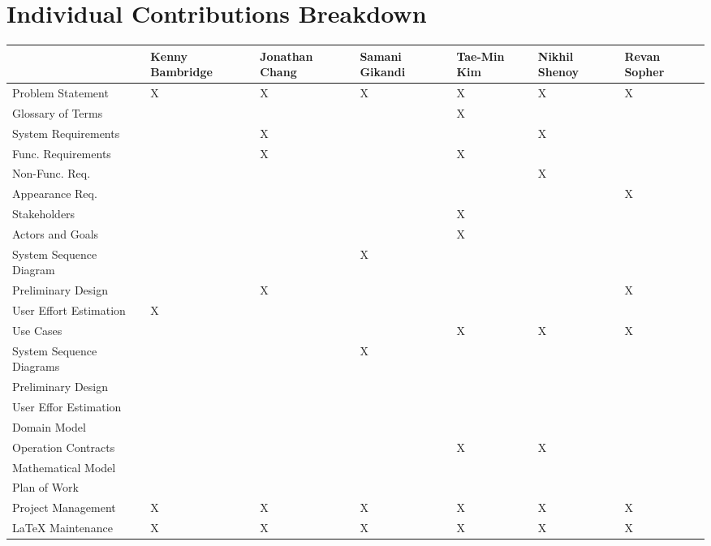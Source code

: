 \documentclass[letterpaper,english, 12pt]{scrreprt}
\begin{document}
\chapter*{Individual Contributions Breakdown}
\begin{center}
	\begin{tabular}{|l|C{2cm}|C{1.5cm}|C{1.5cm}|C{1.5cm}|C{1.5cm}|C{1.5cm}|}
		\hline
			&	Kenny Bambridge		&	Jonathan Chang		&	Samani Gikandi		&	Tae-Min Kim	&	  Nikhil Shenoy		&	Revan Sopher\\ \hline
Problem Statement	&		X		&		X		&		X		&		X	&		X		&	X	    \\ \hline
Glossary of Terms	&				&				&				&		X	&				&      		\\ \hline
System Requirements	&				&		X		&				&			&		X		&		\\ \hline
Func. Requirements	&				&		X		&				&		X	&				&		\\ \hline
Non-Func. Req.		&				&				&				&			&		X		&		\\ \hline
Appearance Req.		&				&				&				&			&				&		X\\ \hline
Stakeholders		&				&				&				&		X	&				&		 \\ \hline
Actors and Goals	&				&				&				&		X	&				&		 \\ \hline
System Sequence Diagram &				&				&		X		&			&				&		 \\ \hline
Preliminary Design	&				&		X		&				&			&				&	X	 \\ \hline
User Effort Estimation  &		X		&				&				&			&				&		 \\ \hline
Use Cases		&				&				&				&		X	&		X		&	X	 \\ \hline
System Sequence Diagrams&		  		&				&		X		&			&				&		 \\ \hline
Preliminary Design	&				&				&				&			&				&		 \\ \hline
User Effor Estimation	&				&				&				&			&				&		 \\ \hline
Domain Model		&				&				&				&			&				&		 \\ \hline
Operation Contracts	&				&				&				&		X	&		X		&		 \\ \hline
Mathematical Model	&				&				&				&			&				&		 \\ \hline
Plan of Work		&				&				&				&			&				&		 \\ \hline
Project Management	&		X		&		X		&		X		&		X	&		X		&		X\\ \hline
LaTeX Maintenance	&		X		&		X		&		X		&		X	&		X		&		X\\ \hline
	\end{tabular}
\end{center}
\end{document}
